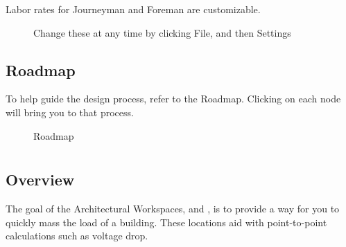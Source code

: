 \documentclass[letterpaper,10pt,english]{sphinxmanual}
\begin{document}
\subsubsection{}
\label{\detokenize{docs/userguide/projectsettings/laborrates/index-labor_rates:labor-rates}}\label{\detokenize{docs/userguide/projectsettings/laborrates/index-labor_rates:id1}}\label{\detokenize{docs/userguide/projectsettings/laborrates/index-labor_rates::doc}}
Labor rates for Journeyman and Foreman are customizable.

\begin{figure}[H]
\centering
\capstart

\noindent{}
\caption{Change these at any time by clicking File, and then Settings}\label{\detokenize{docs/userguide/projectsettings/laborrates/index-labor_rates:id2}}\end{figure}


\subsection{Roadmap}
\label{\detokenize{docs/userguide/index-user_guide:roadmap}}
To help guide the design process, refer to the Roadmap.  Clicking on each node will bring you to that process.

\begin{figure}[H]
\centering
\capstart

\noindent{}
\caption{Roadmap}\label{\detokenize{docs/userguide/index-user_guide:id24}}\end{figure}


\section{}
\label{\detokenize{docs/userguide/index-user_guide:defining-architectural-elements}}\label{\detokenize{docs/userguide/index-user_guide:architectural-workspaces}}

\subsection{Overview}
\label{\detokenize{docs/userguide/index-user_guide:overview}}
The goal of the Architectural Workspaces, {\hyperref[\detokenize{docs/userguide/definingarchitecturalelements/floorplans/index-floor-plans:floor-plans}]{}} and {\hyperref[\detokenize{docs/userguide/definingarchitecturalelements/archelements/index-arch-elements:arch-elements}]{}}, is to provide a way for you to quickly mass the load of a building.  These locations aid with point-to-point calculations such as voltage drop.
\end{document}
